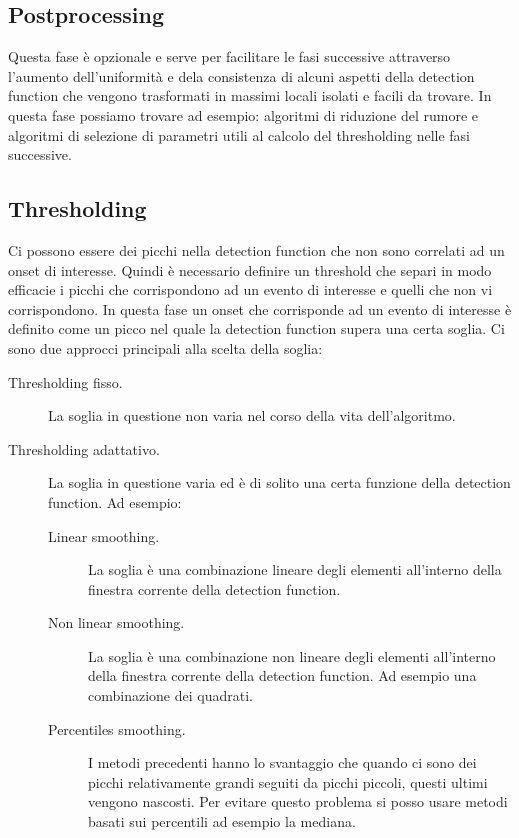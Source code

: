   \subsection{Postprocessing}
	Questa fase \`e opzionale e serve per facilitare le fasi successive attraverso l'aumento dell'uniformit\`a e dela consistenza di alcuni aspetti della detection function che vengono trasformati in massimi locali isolati e facili da trovare. In questa fase possiamo trovare ad esempio: algoritmi di riduzione del rumore e algoritmi di selezione di parametri utili al calcolo del thresholding nelle fasi successive.

  \subsection{Thresholding}
	Ci possono essere dei picchi nella detection function che non sono correlati ad un onset di interesse. Quindi \`e necessario definire un threshold che separi in modo efficacie i picchi che corrispondono ad un evento di interesse e quelli che non vi corrispondono. In questa fase un onset che corrisponde ad un evento di interesse \`e definito come un picco nel quale la detection function supera una certa soglia. Ci sono due approcci principali alla scelta della soglia:
	\begin{description}
	  \item[Thresholding fisso.]
	    La soglia in questione non varia nel corso della vita dell'algoritmo.
	  \item[Thresholding adattativo.]
	    La soglia in questione varia ed \`e di solito una certa funzione della detection function. Ad esempio:
	    \begin{description}
	      \item[Linear smoothing.]
		La soglia \`e una combinazione lineare degli elementi all'interno della finestra corrente della detection function.
	      \item[Non linear smoothing.]
		La soglia \`e una combinazione non lineare degli elementi all'interno della finestra corrente della detection function. Ad esempio una combinazione dei quadrati.
	      \item[Percentiles smoothing.]
		I metodi precedenti hanno lo svantaggio che quando ci sono dei picchi relativamente grandi seguiti da picchi piccoli, questi ultimi vengono nascosti. Per evitare questo problema si posso usare metodi basati sui percentili ad esempio la mediana. 
	    \end{description}
	\end{description}
